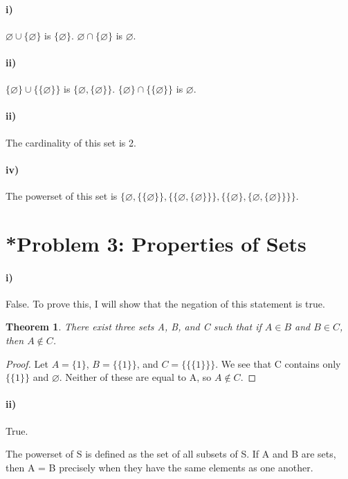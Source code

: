 \documentclass[10pt,letter]{article}
\newtheorem*{thm}{Theorem}
\begin{document}
\paragraph{i)} $\varnothing \cup \{\varnothing\}$ is $\{\varnothing\}.$ $\varnothing \cap \{\varnothing\}$ is $\varnothing$.

\paragraph{ii)} $\{\varnothing\} \cup \{\{\varnothing\}\}$ is $\{ \varnothing, \{\varnothing\} \}$. $\{\varnothing\} \cap \{\{\varnothing\}\}$ is $\varnothing$.

\paragraph{ii)} The cardinality of this set is 2.

\paragraph{iv)} The powerset of this set is $\{ \varnothing, \{\{\varnothing\}\}, \{\{\varnothing, \{\varnothing\}\}\}, \{\{\varnothing\}, \{\varnothing, \{\varnothing\}\}\}\}$.

\section*{*Problem 3: Properties of Sets}

\paragraph{i)} False. To prove this, I will show that the negation of this statement is true. \begin{thm} There exist three sets A, B, and C such that if $A \in B$ and $B \in C$, then $A \not \in C$. \end{thm} \begin{proof} Let $A = \{1\}$, $B = \{\{1\}\}$, and $C = \{ \{ \{1\}\}\}$. We see that C contains only $\{\{1\}\}$ and $\varnothing$. Neither of these are equal to A, so $A \not \in C$. \end{proof}

\paragraph{ii)} True.

The powerset of S is defined as the set of all subsets of S. If A and B are sets, then A = B precisely when they have the same elements as one another.
\end{document}
